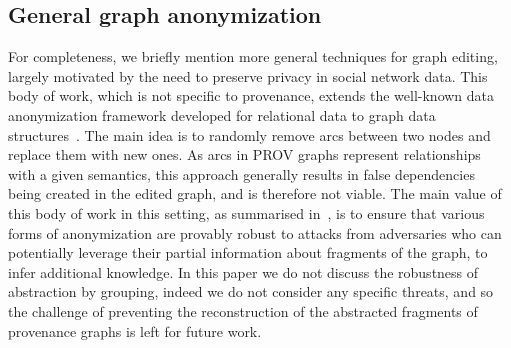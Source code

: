 
\subsection{General graph anonymization}

For completeness, we briefly mention more general techniques for graph editing, largely motivated by the need to preserve privacy in social network data. This body of work, which is not specific to provenance, extends the well-known data anonymization framework developed for relational data to graph data structures~\citep{springerlink:10.1007/978-3-540-78478-4_9,Bhagat:2009:CGA:1687627.1687714,Liu:2008:TIA:1376616.1376629}. The main idea is to randomly remove arcs between two nodes and replace them with new ones. As arcs in PROV graphs represent relationships with a given semantics, this approach generally results in false dependencies being created in the edited graph, and is therefore not viable. 
%
The main value of this body of work in this setting, as summarised in~\citep{Zhou:2008:BSA:1540276.1540279}, is to ensure that various forms of anonymization are provably robust to attacks from adversaries who can potentially leverage their partial information about fragments of the graph, to infer additional knowledge. In this paper we do not discuss the robustness of abstraction by grouping, indeed we do not consider any specific threats, and so the challenge of preventing the reconstruction of the abstracted fragments of provenance graphs is left for future work.



